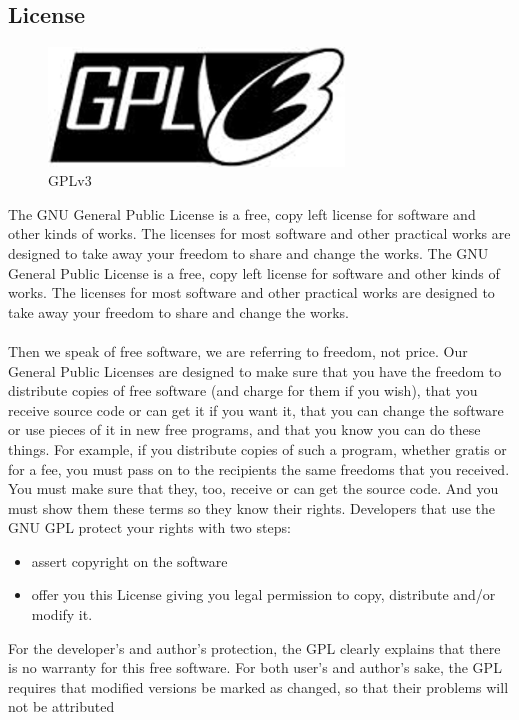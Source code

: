 \subsection{License}
\begin{figure}[h!]
\centering
\includegraphics[width=0.7\textwidth]{images/gpl.jpg}
\caption{GPLv3}
\end{figure}
The GNU General Public License is a free, copy left license for software and other kinds
of works. The licenses for most software and other practical works are designed to take
away your freedom to share and change the works. The GNU General Public License is a free, copy left license for software and other kinds
of works. The licenses for most software and other practical works are designed to take
away your freedom to share and change the works.\\\\
Then we speak of free software, we are referring to freedom, not price. Our General
Public Licenses are designed to make sure that you have the freedom to distribute copies
of free software (and charge for them if you wish), that you receive source code or can get
it if you want it, that you can change the software or use pieces of it in new free programs,
and that you know you can do these things. For example, if you distribute copies of such a program, whether gratis or for a fee,
you must pass on to the recipients the same freedoms that you received. You must make
sure that they, too, receive or can get the source code. And you must show them these
terms so they know their rights. Developers that use the GNU GPL protect your rights
with two steps:
\begin{itemize}
\item assert copyright on the software
\item offer you this License giving you legal permission to copy, distribute and/or modify
it.
\end{itemize}
For the developer’s and author’s protection, the GPL clearly explains that there is no
warranty for this free software. For both user’s and author’s sake, the GPL requires that
modiﬁed versions be marked as changed, so that their problems will not be attributed
